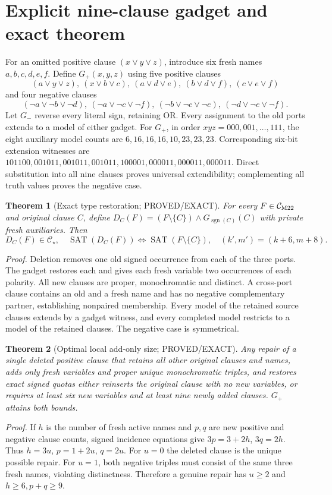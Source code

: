 \documentclass[11pt]{article}
\newtheorem{theorem}{Theorem}
\begin{document}
\section{Explicit nine-clause gadget and exact theorem}
For an omitted positive clause $(x\lor y\lor z)$, introduce six fresh names $a,b,c,d,e,f$. Define $G_+(x,y,z)$ using five positive clauses
\[(a\lor y\lor z),\ (x\lor b\lor c),\ (a\lor d\lor e),\ (b\lor d\lor f),\ (c\lor e\lor f)\]
and four negative clauses
\[(\neg a\lor\neg b\lor\neg d),\ (\neg a\lor\neg c\lor\neg f),\ (\neg b\lor\neg c\lor\neg e),\ (\neg d\lor\neg e\lor\neg f).\]
Let $G_-$ reverse every literal sign, retaining OR. Every assignment to the old ports extends to a model of either gadget. For $G_+$, in order $xyz=000,001,\ldots,111$, the eight auxiliary model counts are $6,16,16,16,10,23,23,23$. Corresponding six-bit extension witnesses are $101100,001011,001011,001011,100001,000011,000011,000011$. Direct substitution into all nine clauses proves universal extendibility; complementing all truth values proves the negative case.
\begin{theorem}[Exact type restoration; PROVED/EXACT]
For every $F\in\mathcal C_{\rm M22}$ and original clause $C$, define $D_C(F)=(F\setminus\{C\})\land G_{\operatorname{sgn}(C)}(C)$ with private fresh auxiliaries. Then
\[D_C(F)\in\mathcal C_\star,\quad \operatorname{SAT}(D_C(F))\iff\operatorname{SAT}(F\setminus\{C\}),\quad (k',m')=(k+6,m+8).\]
\end{theorem}
\noindent\textit{Proof.} Deletion removes one old signed occurrence from each of the three ports. The gadget restores each and gives each fresh variable two occurrences of each polarity. All new clauses are proper, monochromatic and distinct. A cross-port clause contains an old and a fresh name and has no negative complementary partner, establishing nonpaired membership. Every model of the retained source clauses extends by a gadget witness, and every completed model restricts to a model of the retained clauses. The negative case is symmetrical.
\begin{theorem}[Optimal local add-only size; PROVED/EXACT]
Any repair of a single deleted positive clause that retains all other original clauses and names, adds only fresh variables and proper unique monochromatic triples, and restores exact signed quotas either reinserts the original clause with no new variables, or requires at least six new variables and at least nine newly added clauses. $G_+$ attains both bounds.
\end{theorem}
\noindent\textit{Proof.} If $h$ is the number of fresh active names and $p,q$ are new positive and negative clause counts, signed incidence equations give $3p=3+2h$, $3q=2h$. Thus $h=3u$, $p=1+2u$, $q=2u$. For $u=0$ the deleted clause is the unique possible repair. For $u=1$, both negative triples must consist of the same three fresh names, violating distinctness. Therefore a genuine repair has $u\ge2$ and $h\ge6,p+q\ge9$.
\end{document}
